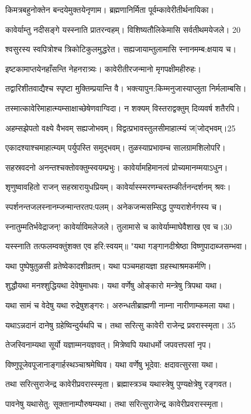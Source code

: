  किमत्रबहुनोक्तेन बन्दयेमुक्तयेनृणाम।
 ब्रह्मणानिर्मिता पूर्वम्कावेरीतीर्थनायिका।

 कावेर्याम्तु नदीसङ्गे यस्स्नाति प्रातरन्वहम्।
 विशिष्यतौलिकेमासि सर्वतीथमयेजले। 20

 श्वसुरस्य स्वपित्रोश्च त्रिकोटिकुलमुद्धरेत।
 सह्यजायाम्तुलामासि स्नानमम्ब:क्षयाय च।
 
 इष्टकामाप्तयेनहाँसन्ति नेहनरात्र्यः।
 कावेरीतीरजन्मानो मृगपक्षीमहीरुहः।
 
 तद्वारिशीतवाद्यैश्च स्पृष्टा मुक्तिम्प्रयान्ति वै।
 भक्त्यापुन:किम्मनुजास्याप्लुता निर्मलाम्बसि।
 
 तस्मात्कावेरिमाहात्म्यम्साक्षाच्छेषेणवाग्विदा।
 न शक्यम् विस्तराद्वक्तुम् दिव्यवर्ष शतैरपि।
 
 अहम्सझेपतो वक्ष्ये वैभवम् सह्यजोभवम्।
 विद्वत्प्रभावस्तुलसीमाहात्म्यं ज[जोद्भवम्।25

 एकादश्याश्चमाहात्म्यम् पर्युपस्ति समुद्भवम्।
 तुळस्याप्रभावम्च सालग्रामशिलोपरि।
 
 सहस्रवदनो अनन्तश्चक्तोवक्तुम्स्वयम्प्रभुः।
 कावेर्यामहिमानत्वं प्रोच्यमानम्मयाऽधुन।
 
 शृणुष्वावहितो राजन् सहस्रारायुधप्रियम्।
 कावेर्यास्स्मरणम्चस्तम्कीर्तनन्दर्शनम् श्रवः।
 
 स्पर्शनन्तजलस्नानम्जन्मान्तरतप:पलम्।
 अनेकजन्मसम्सिद्ध पुण्यराशेर्नगस्य च।
 
 स्नातुम्मतिर्भवेद्राजन्! कावेर्याविमलेजले।
 तुलामासे च कावेर्याम्माघेवैशाख एव च।30

 यस्स्नाति तत्फलम्वक्तुंशक्त एव हरि:स्वयम्॥
 "यथा गङ्गानदीश्रेष्ठा विष्णुपादाब्जसम्भवा।
 
 यथा पुष्पेषुतुळसी व्रतेष्वेकादशीव्रतम्।
 यथा पञ्चमहायज्ञा ग्रहस्थाश्रमकर्मणि।
 
 शुद्धौयथा मनश्शुद्धियथा देवेषुमाधवः।
 यथा वर्णेषु ओङ्कारो मन्त्रेषु त्रिपथा यथा।
 
 यथा सामं च वेदेषु यथा रुद्रेषुशङ्गरः।
 अरुन्धतीब्राह्मणी नाम्ना नारीणाम्कमला यथा।
 
 यथाऽन्नदानं दानेषु ग्रहेष्विन्दुर्यथपि च।
 तथा सरित्सु कावेरी राजेन्द्र प्रवरास्स्मृता। 35

  तेजस्विनाम्यथा सूर्यो यज्ञाम्मनयज्ञवत्।
मित्रेष्वपि यथाधर्मो जपवत्तपसां नृप।

 विष्णुपूजेवपूजानाङ्गार्हस्थञ्चाश्रमेष्विव।
 यथा वर्णेषु भूदेवा: क्षदावत्सुरसा यथा।

 तथा सरित्सुराजेन्द्र कावेरीप्रवरास्स्मृता।
 ब्रह्मास्त्रञ्च यथास्त्रेषु पुण्यक्षेत्रेषु रङ्गवत।

 पावनेषु यथासेतु: सूक्तानाम्पौरुषम्यथा।
 तथा सरित्सुराजेन्द्र कावेरीप्रवरास्स्मृता।

